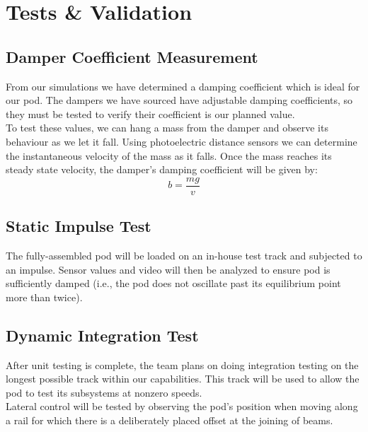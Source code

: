 \documentclass[main.tex]{subfiles}
\begin{document}
    \section{Tests \& Validation }
    \subsection{Damper Coefficient Measurement}
    From our simulations we have determined a damping coefficient which is ideal for our pod. The dampers we have sourced have adjustable damping coefficients, so they must be tested to verify their coefficient is our planned value.\\
    To test these values, we can hang a mass from the damper and observe its behaviour as we let it fall. Using photoelectric distance sensors we can determine the instantaneous velocity of the mass as it falls. Once the mass reaches its steady state velocity, the damper's damping coefficient will be given by:
	\[
     b = \frac{mg}{v}
    \]
    \subsection{Static Impulse Test}
    The fully-assembled pod will be loaded on an in-house test track and subjected to an impulse. Sensor values and video will then be analyzed to ensure pod is sufficiently damped (i.e., the pod does not oscillate past its equilibrium point more than twice).
    \subsection{Dynamic Integration Test}
    After unit testing is complete, the team plans on doing integration testing on the longest possible track within our capabilities. This track will be used to allow the pod to test its subsystems at nonzero speeds.\\
    Lateral control will be tested by observing the pod's position when moving along a rail for which there is a deliberately placed offset at the joining of beams.
\end{document}
